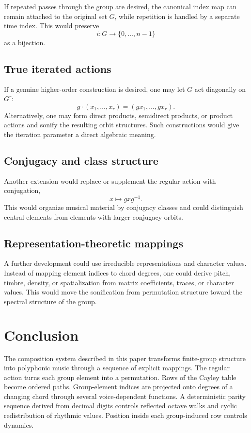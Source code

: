 \documentclass[11pt,a4paper]{article}
\begin{document}
If repeated passes through the group are desired, the canonical index map can remain attached to the original set $G$, while repetition is handled by a separate time index. This would preserve
\[
i:G\longrightarrow\{0,\ldots,n-1\}
\]
as a bijection.

\subsection{True iterated actions}

If a genuine higher-order construction is desired, one may let $G$ act diagonally on $G^r$:
\[
g\cdot(x_1,\ldots,x_r)
=
(gx_1,\ldots,gx_r).
\]
Alternatively, one may form direct products, semidirect products, or product actions and sonify the resulting orbit structures. Such constructions would give the iteration parameter a direct algebraic meaning.

\subsection{Conjugacy and class structure}

Another extension would replace or supplement the regular action with conjugation,
\[
x\longmapsto gxg^{-1}.
\]
This would organize musical material by conjugacy classes and could distinguish central elements from elements with larger conjugacy orbits.

\subsection{Representation-theoretic mappings}

A further development could use irreducible representations and character values. Instead of mapping element indices to chord degrees, one could derive pitch, timbre, density, or spatialization from matrix coefficients, traces, or character values. This would move the sonification from permutation structure toward the spectral structure of the group.

\section{Conclusion}

The composition system described in this paper transforms finite-group structure into polyphonic music through a sequence of explicit mappings. The regular action turns each group element into a permutation. Rows of the Cayley table become ordered paths. Group-element indices are projected onto degrees of a changing chord through several voice-dependent functions. A deterministic parity sequence derived from decimal digits controls reflected octave walks and cyclic redistribution of rhythmic values. Position inside each group-induced row controls dynamics.
\end{document}
